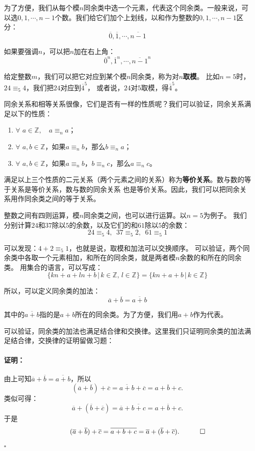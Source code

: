 \documentclass[12pt,UTF8]{ctexbook}
\newenvironment{proof2}{\paragraph{\textbf{证明：}}}{\hfill$\square$}
\begin{document}
为了方便，我们从每个模$n$同余类中选一个元素，代表这个同余类。一般来说，可以选$0,1,\cdots,n-1$个数。我们给它们加个上划线，以和作为整数的$0,1,\cdots,n-1$区分：
$$\overline{0},\overline{1},\cdots,\overline{n-1}$$

如果要强调$n$，可以把$n$加在右上角：
$$\overline{0}^n,\overline{1}^n,\cdots,\overline{n-1}^n$$

给定整数$m$，我们可以把它对应到某个模$n$同余类，称为对$n$\textbf{取模}。
比如$n=5$时，$24 \equiv_5 4$，我们把$24$对应到$\overline{4}^5$，
或者说，$24$对$5$取模，得$\overline{4}^5$。

同余关系和相等关系很像，它们是否有一样的性质呢？我们可以验证，同余关系满足以下的性质：
\begin{enumerate}
    \item $\forall \,\, a\in \mathbb{Z}, \quad a \equiv_n a$；
    \item $\forall \,\, a, b \in \mathbb{Z}$，如果$a \equiv_n b$，那么$b \equiv_n a$；
    \item $\forall \,\, a, b \in \mathbb{Z}$，如果$a \equiv_n b$，$b \equiv_n c$，那么$a \equiv_n c$。
\end{enumerate}

满足以上三个性质的二元关系（两个元素之间的关系）称为\textbf{等价关系}。数与数的等于关系是等价关系，数与数的同余关系
也是等价关系。因此，我们可以把同余关系用作同余类之间的等于关系。

整数之间有四则运算，模$n$同余类之间，也可以进行运算。以$n=5$为例子。
我们分别计算$24$和$37$除以$5$的余数，以及它们的和$61$除以$5$的余数：
$$ 24 \equiv_5 4, \,\,\, 37 \equiv_5 2 , \,\,\, 61 \equiv_5 1$$

可以发现：$ 4 + 2 \equiv_5 1$，也就是说，取模和加法可以交换顺序。
可以验证，两个同余类中各取一个元素相加，和所在的同余类，就是两者模$n$余数的和所在的同余类。
用集合的语言，可以写成：
$$\{kn + a + ln + b \, | \, k\in\mathbb{Z}, \, l\in\mathbb{Z} \} = \{kn + a + b \, | \, k\in\mathbb{Z} \}$$

所以，可以定义同余类的加法：
$$ \overline{a} + \overline{b} = \overline{a + b}$$

其中的$\overline{a + b}$指的是$a+b$所在的同余类。为了方便，我们用$a + b$作为代表。

可以验证，同余类的加法也满足结合律和交换律。这里我们只证明同余类的加法满足结合律，交换律的证明留做习题：

\begin{proof2}
    由上可知$ \overline{a} + \overline{b} = \overline{a + b}$，所以
    $$ (\overline{a} + \overline{b}) + \overline{c} = \overline{a + b}+ \overline{c} = \overline{a + b + c}.$$
    类似可得：
    $$ \overline{a} + (\overline{b} + \overline{c}) = \overline{a}+ \overline{b + c} = \overline{a + b + c}.$$
    于是
    $$ \quad \quad \quad (\overline{a} + \overline{b}) + \overline{c}  = \overline{a + b + c} = \overline{a} + (\overline{b} + \overline{c}). \quad \qedhere$$
\end{proof2}
\end{document}
